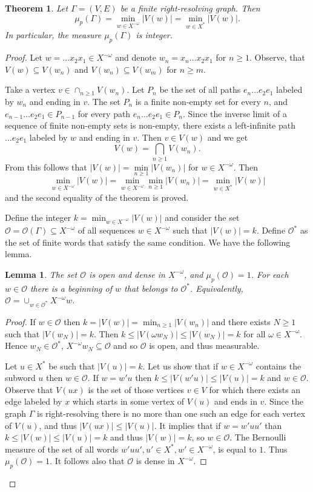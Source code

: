 \documentclass[12pt]{article}
\newcommand{\xmo}{X^{-\omega}}
\newcommand{\gr}{\Gamma}
\newtheorem{theor}{Theorem}
\newtheorem{lemma}{Lemma}
\theoremstyle{definition}
\begin{document}
\begin{theor}\label{theor_measure_graph_integer}
Let $\gr=(V,E)$ be a finite right-resolving graph. Then
\[
\mu_p(\gr)=\min_{w\in\xmo} |V(w)|=\min_{w\in X^*} |V(w)|.
\]
In particular, the measure $\mu_p(\gr)$ is integer.
\end{theor}
\begin{proof}
Let $w=\ldots x_2x_1\in\xmo$ and denote $w_n=x_n\ldots x_2x_1$ for $n\geq 1$. Observe, that
$V(w)\subseteq V(w_n)$ and $V(w_n)\subseteq V(w_m)$ for $n\geq m$.

Take a vertex $v\in \cap_{n\geq 1} V(w_n)$. Let $P_n$ be the set of all paths $e_n\ldots e_2e_1$
labeled by $w_n$ and ending in $v$. The set $P_n$ is a finite non-empty set for every $n$, and
$e_{n-1}\ldots e_2e_1\in P_{n-1}$ for every path $e_n\ldots e_2e_1\in P_n$. Since the inverse limit
of a sequence of finite non-empty sets is non-empty, there exists a left-infinite path $\ldots
e_2e_1$ labeled by $w$ and ending in $v$. Then $v\in V(w)$ and we get
\begin{equation}\label{eqn_th1_V(w) eq cap V(w_n)}
V(w)=\bigcap_{n\geq 1} V(w_n).
\end{equation}
From this follows that $|V(w)|=\min\limits_{n\geq 1} |V(w_n)|$ for $w\in\xmo$. Then
\[
\min_{w\in\xmo} |V(w)|=\min_{w\in\xmo} \min_{n\geq 1} |V(w_n)|=\min_{w\in X^*} |V(w)|
\]
and the second equality of the theorem is proved.

Define the integer $k=\min_{w\in\xmo} |V(w)|$ and consider the set
$\mathcal{O}=\mathcal{O}(\gr)\subseteq\xmo$ of all sequences $w\in\xmo$ such that $|V(w)|=k$.
Define $\mathcal{O}^*$ as the set of finite words that satisfy the same condition. We have the
following lemma.
\begin{lemma}\label{lemma_set V open dense}
The set $\mathcal{O}$ is open and dense in $\xmo$, and $\mu_p(\mathcal{O})=1$. For each
$w\in\mathcal{O}$ there is a beginning of $w$ that belongs to $\mathcal{O}^*$. Equivalently,
$\mathcal{O}=\cup_{w\in\mathcal{O}^*}\xmo w$.
\end{lemma}
\begin{proof}
If $w\in\mathcal{O}$ then $k=|V(w)|=\min_{n\geq 1} |V(w_n)|$ and there exists $N\geq 1$ such that
$|V(w_N)|=k$. Then $k\leq |V(\omega w_N)|\leq |V(w_N)|=k$ for all $\omega\in\xmo$. Hence
$w_N\in\mathcal{O}^*$, $\xmo w_N\subseteq\mathcal{O}$ and so $\mathcal{O}$ is open, and thus
measurable.

Let $u\in X^*$ be such that $|V(u)|=k$. Let us show that if $w\in\xmo$ contains the subword $u$
then $w\in\mathcal{O}$. If $w=w'u$ then $k\leq |V(w'u)|\leq |V(u)|=k$ and $w\in\mathcal{O}$.
Observe that $V(ux)$ is the set of those vertices $v\in V$ for which there exists an edge labeled
by $x$ which starts in some vertex of $V(u)$ and ends in $v$. Since the graph $\gr$ is
right-resolving there is no more than one such an edge for each vertex of $V(u)$, and thus
$|V(ux)|\leq |V(u)|$. It implies that if $w=w'uu'$ than $k\leq |V(w)|\leq |V(u)|=k$ and thus
$|V(w)|=k$, so $w\in\mathcal{O}$. The Bernoulli measure of the set of all words $w'uu', u'\in X^*,
w'\in\xmo$, is equal to $1$. Thus $\mu_p(\mathcal{O})=1$. It follows also that $\mathcal{O}$ is
dense in $\xmo$.
\end{proof}



\end{proof}
\end{document}
